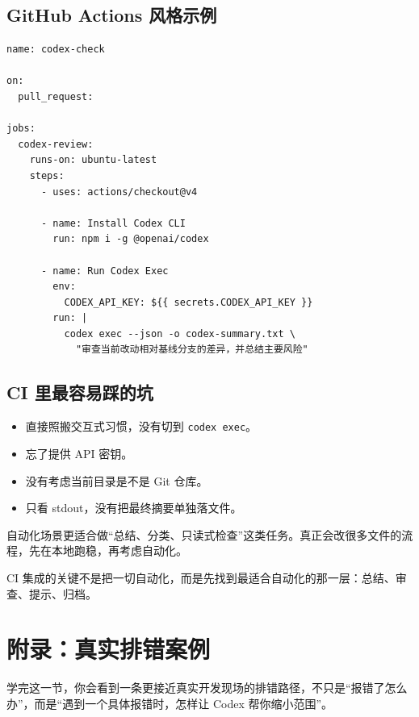 \documentclass[UTF8,a4paper,12pt]{ctexart}
\begin{document}
\subsection{GitHub Actions 风格示例}

\begin{lstlisting}[style=cli]
name: codex-check

on:
  pull_request:

jobs:
  codex-review:
    runs-on: ubuntu-latest
    steps:
      - uses: actions/checkout@v4

      - name: Install Codex CLI
        run: npm i -g @openai/codex

      - name: Run Codex Exec
        env:
          CODEX_API_KEY: ${{ secrets.CODEX_API_KEY }}
        run: |
          codex exec --json -o codex-summary.txt \
            "审查当前改动相对基线分支的差异，并总结主要风险"
\end{lstlisting}

\subsection{CI 里最容易踩的坑}

\begin{itemize}
  \item 直接照搬交互式习惯，没有切到 \texttt{codex exec}。
  \item 忘了提供 API 密钥。
  \item 没有考虑当前目录是不是 Git 仓库。
  \item 只看 stdout，没有把最终摘要单独落文件。
\end{itemize}

\begin{warnbox}
自动化场景更适合做“总结、分类、只读式检查”这类任务。真正会改很多文件的流程，先在本地跑稳，再考虑自动化。
\end{warnbox}

\begin{sumbox}
CI 集成的关键不是把一切自动化，而是先找到最适合自动化的那一层：总结、审查、提示、归档。
\end{sumbox}

\section{附录：真实排错案例}

\begin{learnbox}
学完这一节，你会看到一条更接近真实开发现场的排错路径，不只是“报错了怎么办”，而是“遇到一个具体报错时，怎样让 Codex 帮你缩小范围”。
\end{learnbox}
\end{document}
